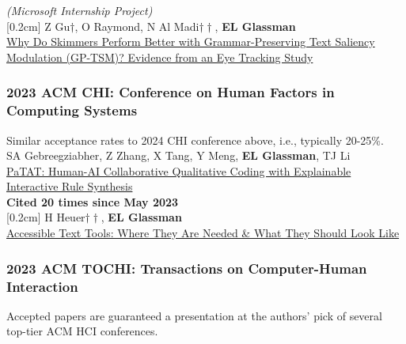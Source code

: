 \documentclass[10pt, a4paper]{article}
\newcommand{\years}[1]{\marginnote{\normalsize #1}}
\begin{document}
\textit{(Microsoft Internship Project)}\\
[0.2cm]
\years{\textbf{C31} LBW}Z Gu$\dagger$, O Raymond, N Al Madi$\dagger\dagger$, \textbf{EL Glassman}\\
\href{https://glassmanlab.seas.harvard.edu/papers/gptsm_eye_lbw.pdf}{Why Do Skimmers Perform Better with Grammar-Preserving Text Saliency Modulation (GP-TSM)? Evidence from an Eye Tracking Study}

\subsubsection*{2023 ACM \textbf{CHI}: Conference on Human Factors in Computing Systems}
Similar acceptance rates to 2024 CHI conference above, i.e., typically 20-25\%.\\[0.2cm]
\years{\textbf{C30}}SA Gebreegziabher, Z Zhang, X Tang, Y Meng, \textbf{EL Glassman}, TJ Li\\ \href{http://glassmanlab.seas.harvard.edu/papers/patat_CHI23.pdf}{PaTAT: Human-AI Collaborative Qualitative Coding with Explainable Interactive Rule Synthesis}\\
\textbf{Cited 20 times since May 2023}\\
[0.2cm]
\years{\textbf{C29} LBW}H Heuer$\dagger\dagger$, \textbf{EL Glassman}\\
\href{https://glassmanlab.seas.harvard.edu/papers/heuer_CHI23LBW_accessibleTextTools.pdf}{Accessible Text Tools: Where They Are Needed \& What They Should Look Like}\\

\subsubsection*{2023 ACM \textbf{TOCHI}: Transactions on Computer-Human Interaction}
Accepted papers are guaranteed a presentation at the authors' pick of several top-tier ACM HCI conferences.\\
\end{document}
